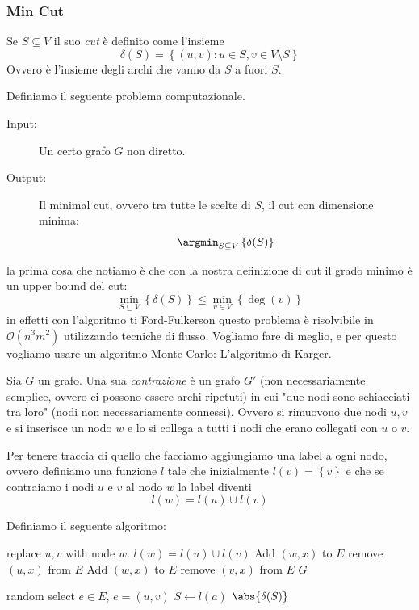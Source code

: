 \documentclass[11pt]{scrartcl}
\newcommand{\bigo}{\mathcal{O}}
\begin{document}
	\subsubsection{Min Cut}
	
	\begin{definition}[Cut]
		Se $S\subseteq V$ il suo \textit{cut} è definito come l'insieme
		$$\delta(S)=\left\{(u,v):u\in S,v\in V\setminus S\right\}$$
		Ovvero è l'insieme degli archi che vanno da $S$ a fuori $S$.
	\end{definition}
	
	\begin{example}
		Definiamo il seguente problema computazionale.
		\begin{description}
			\item[Input:] Un certo grafo $G$ non diretto.
			\item[Output:] Il minimal cut, ovvero tra tutte le scelte di $S$, il cut con dimensione minima:
			$$\argmin_{S\subseteq V}\left\{\delta(S)\right\}$$
		\end{description}
	\end{example}
	la prima cosa che notiamo è che con la nostra definizione di cut il grado minimo è un upper bound del cut:
	$$\min_{S\subseteq V}\left\{\delta(S)\right\}\le \min_{v\in V}\left\{\deg(v)\right\}$$
	in effetti con l'algoritmo ti Ford-Fulkerson questo problema è risolvibile in $\bigo(n^3m^2)$ utilizzando tecniche di flusso. Vogliamo fare di meglio, e per questo vogliamo usare un algoritmo Monte Carlo: L'algoritmo di Karger.
	\begin{definition}[Contraction]
		Sia $G$ un grafo. Una sua \textit{contrazione} è un grafo $G'$ (non necessariamente semplice, ovvero ci possono essere archi ripetuti) in cui "due nodi sono schiacciati tra loro" (nodi non necessariamente connessi). Ovvero si rimuovono due nodi $u,v$ e si inserisce un nodo $w$ e lo si collega a tutti i nodi che erano collegati con $u$ o $v$.
	\end{definition}
	Per tenere traccia di quello che facciamo aggiungiamo una label a ogni nodo, ovvero definiamo una funzione $l$ tale che inizialmente $l(v)=\left\{v\right\}$ e che se contraiamo i nodi $u$ e $v$ al nodo $w$ la label diventi
	$$l(w)=l(u)\cup l(v)$$
	\begin{algorithm}[Karger]
		Definiamo il seguente algoritmo:
		\begin{algorithmic}[1]
				\State replace $u,v$ with node $w$.
				\State $l(w)=l(u)\cup l(v)$
					\State Add $(w,x)$ to $E$
					\State remove $(u,x)$ from $E$
				\EndFor
					\State Add $(w,x)$ to $E$
					\State remove $(v,x)$ from $E$
				\EndFor
				\State \Return $G$
			\EndFunction
			
					\State random select $e\in E$, $e=(u,v)$
					\State {}
				\EndWhile
				\State $S\gets l(a)$ 
				\State \Return $\abs{\delta(S)}$
			\EndFunction
		\end{algorithmic}
	\end{algorithm}
\end{document}
